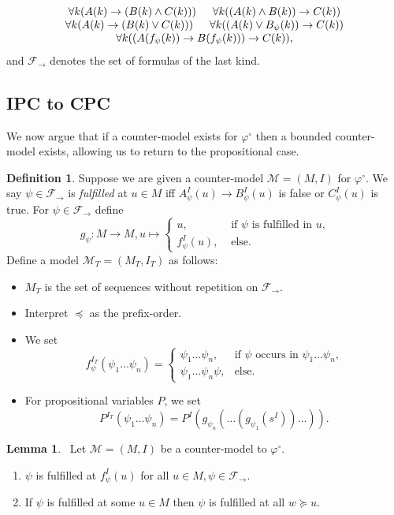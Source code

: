 \documentclass[a4paper,11pt]{report}
\theoremstyle{definition}
\theoremstyle{definition}
\theoremstyle{definition}
\newtheorem{lemma}[theorem]{Lemma}
\theoremstyle{definition}
\theoremstyle{definition}
\newtheorem{definition}[theorem]{Definition}
\theoremstyle{definition}
\theoremstyle{definition}
\begin{document}
	$$\begin{matrix}
		\forall k(A(k)\to (B(k)\wedge C(k)))\indent\forall k((A(k)\wedge B(k))\to C(k))\\
		\forall k(A(k)\to (B(k)\vee C(k)))\indent\forall k((A(k)\vee B_\psi(k))\to C(k))\\
		\forall k((A(f_\psi(k))\to B(f_\psi(k)))\to C(k)),
	\end{matrix}$$
	and $\mathcal F_\to$ denotes the set of formulas of the last kind.

	
	\subsection{IPC to CPC}
	
	We now argue that if a counter-model exists for $\varphi^\circ$ then a bounded counter-model exists, allowing us to return to the propositional case.
	
	\begin{definition}
		Suppose we are given a counter-model $\mathcal M = (M, I)$ for $\varphi^\circ$.
		We say $\psi\in\mathcal F_\to$ is \emph{fulfilled} at $u\in M$ iff $A_\psi^I(u)\to B_\psi^I(u)$ is false or $C_\psi^I(u)$ is true. For $\psi\in\mathcal F_\to$ define $$g_\psi : M\to M, u\mapsto\begin{cases}
			u,&\text{ if $\psi$ is fulfilled in $u$,}\\
			f^I_\psi(u),&\text{ else.}		
		\end{cases}$$Define a model $\mathcal M_T = (M_T, I_T)$ as follows:
		\begin{itemize}
			\item $M_T$ is the set of sequences without repetition on $\mathcal F_\to$.
			\item Interpret $\preceq$ as the prefix-order.
			\item We set $$f_\psi^{I_T}(\psi_1\dots\psi_n) = \begin{cases}
				\psi_1\dots\psi_n, &\text{if $\psi$ occurs in $\psi_1\dots\psi_n$,}\\
				\psi_1\dots\psi_n\psi, &\text{else.}			
			\end{cases}$$
			\item For propositional variables $P$, we set $$P^{I_T}(\psi_1\dots \psi_n) = P^I(g_{\psi_n}(\dots(g_{\psi_1}(s^I))\dots)).$$
		\end{itemize}
	\end{definition}
	\begin{lemma}~\label{thm:prop-countermodel-reduction}
		Let $\mathcal M = (M, I)$ be a counter-model to $\mathcal \varphi^\circ$.
		\begin{enumerate}
			\item $\psi$ is fulfilled at $f_\psi^I(u)$ for all $u\in M, \psi\in\mathcal F_\to$.
			\item If $\psi$ is fulfilled at some $u\in M$ then $\psi$ is fulfilled at all $w\succeq u$.
		\end{enumerate}
	\end{lemma}
	
\end{document}
